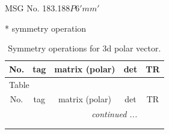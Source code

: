 \documentclass[fleqn,8pt]{jsarticle}
\begin{document}
\setcounter{MaxMatrixCols}{32}

\renewcommand{\tablename}{Table~}
\renewcommand{\figurename}{Figure~}
\begin{center}
\LARGE
MSG No. 183.188\quad$P6'mm'$
\end{center}
* symmetry operation
\renewcommand{\arraystretch}{1.3}
\begin{longtable}{ccccc}
\caption{Symmetry operations for 3d polar vector.}
 \\
 \hline \hline
No. & tag & matrix (polar) & det & TR \\ \hline \endfirsthead

\multicolumn{4}{l}{\tablename\ \thetable{}} \\
 \hline \hline
No. & tag & matrix (polar) & det & TR \\ \hline \endhead

 \hline \hline
\multicolumn{4}{r}{\footnotesize\it continued ...} \\ \endfoot

 \hline \hline
\multicolumn{4}{r}{} \\ \endlastfoot


\end{longtable}
\end{document}
